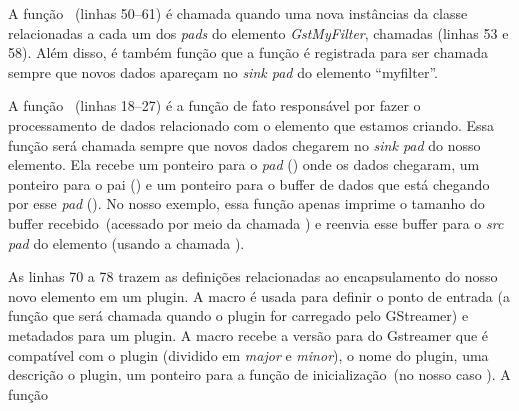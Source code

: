 A função ~(linhas 50--61) é chamada quando uma nova
instâncias da classe  relacionadas a cada um dos \emph{pads} do
elemento \emph{GstMyFilter}, chamadas 
(linhas 53 e 58).  Além disso, é também função  que a
função  é registrada para ser chamada sempre que
novos dados apareçam no \emph{sink pad} do elemento ``myfilter''.

A função ~(linhas 18--27) é a função de fato responsável
por fazer o processamento de dados relacionado com o elemento que estamos
criando.  Essa função será chamada sempre que novos dados chegarem no
\emph{sink pad} do nosso elemento.  Ela recebe um ponteiro para o \emph{pad}
() onde os dados chegaram, um ponteiro para o pai () e
um ponteiro para o buffer de dados que está chegando por esse \emph{pad}
().  No nosso exemplo, essa função apenas imprime o tamanho do
buffer recebido~(acessado por meio da chamada ) e
reenvia esse buffer para o \emph{src pad} do elemento (usando a chamada
).


As linhas 70 a 78 trazem as definições relacionadas ao encapsulamento do nosso
novo elemento em um plugin.  A macro  é usada para
definir o ponto de entrada (a função que será chamada quando o plugin for
carregado pelo GStreamer) e metadados para um plugin.  A macro recebe a versão
para do Gstreamer que é compatível com o  plugin (dividido em \emph{major} e
\emph{minor}), o nome do plugin, uma descrição o plugin, um ponteiro para a
função de inicialização~(no nosso caso ).  A função 




